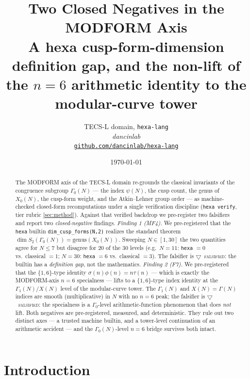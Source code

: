 \documentclass[11pt,a4paper]{article}
\title{
  \textbf{Two Closed Negatives in the MODFORM Axis}\\[4pt]
  \large A hexa cusp-form-dimension definition gap, and the non-lift of the
  $n=6$ arithmetic identity to the modular-curve tower
}
\author{
  TECS-L domain, \texttt{hexa-lang}\\
  \normalsize\textit{dancinlab}\\[2pt]
  \normalsize\href{https://github.com/dancinlab/hexa-lang}{\texttt{github.com/dancinlab/hexa-lang}}
}
\date{\today}
\newcommand{\tierX}{\textcolor{red!70!black}{$\bigtriangledown$}}  %
\newcommand{\sig}{\sigma}
\newcommand{\Gz}{\Gamma_0}
\newcommand{\Go}{\Gamma_1}
\theoremstyle{definition}
\begin{document}
\maketitle

\begin{abstract}
The MODFORM axis of the TECS-L domain re-grounds the classical invariants of
the congruence subgroup $\Gz(N)$ --- the index $\psi(N)$, the cusp count, the
genus of $X_0(N)$, the cusp-form weight, and the Atkin--Lehner group order ---
as machine-checked closed-form recomputations under a single verification
discipline (\texttt{hexa verify}, tier rubric \textsection\ref{sec:method}).
Against that verified backdrop we pre-register two falsifiers and report two
\emph{closed-negative} findings. \emph{Finding 1 (MF4).} We pre-registered that
the \texttt{hexa} builtin \texttt{dim\_cusp\_forms(N,2)} realizes the standard
theorem $\dim S_2(\Gz(N)) = \mathrm{genus}(X_0(N))$. Sweeping $N \in [1,30]$ the
two quantities agree for $N\le 7$ but disagree for $20$ of the $30$ levels (e.g.\
$N=11$: \texttt{hexa} $=0$ vs.\ classical $=1$; $N=30$: \texttt{hexa} $=6$ vs.\
classical $=3$). The falsifier is \tierX\ \textsc{falsified}: the builtin has a
\emph{definition gap}, not the mathematics. \emph{Finding 2 (F7).} We
pre-registered that the $\{1,6\}$-type identity $\sig(n)\phi(n)=n\tau(n)$ ---
which is exactly the MODFORM-axis $n=6$ specialness --- lifts to a $\{1,6\}$-type
index identity at the $\Go(N)/X(N)$ level of the modular-curve tower. The
$\Go(N)$ and $X(N)=\Gamma(N)$ indices are smooth (multiplicative) in $N$ with no
$n=6$ peak; the falsifier is \tierX\ \textsc{falsified}: the specialness is a
$\Gz$-level arithmetic-function phenomenon that does \emph{not} lift. Both
negatives are pre-registered, measured, and deterministic. They rule out two
distinct axes --- a trusted machine builtin, and a tower-level continuation of
an arithmetic accident --- and the $\Gz(N)$-level $n=6$ bridge survives both
intact.
\end{abstract}

\section{Introduction}
\label{sec:intro}
\end{document}

